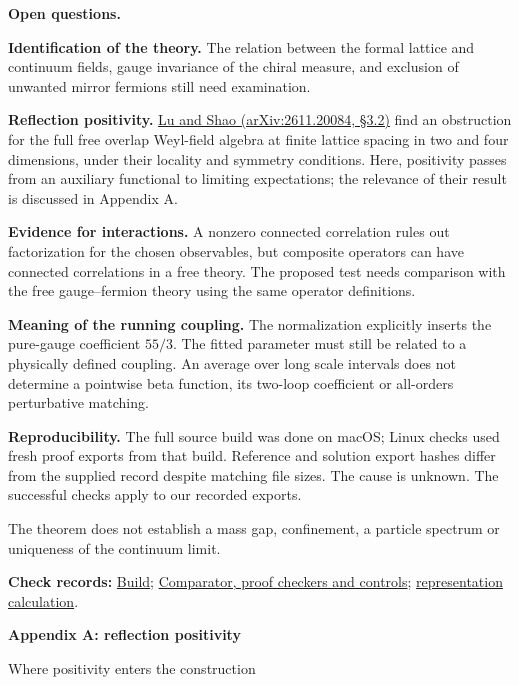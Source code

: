 \documentclass[11pt]{article}
\begin{document}
\textbf{Open questions.}
\begin{list}{\textbullet}{\setlength{\leftmargin}{12pt}\setlength{\itemsep}{2pt}\setlength{\parsep}{0pt}\setlength{\topsep}{2pt}}
\item \textbf{Identification of the theory.}
The relation between the formal lattice and continuum fields, gauge invariance
of the chiral measure, and exclusion of unwanted mirror fermions still need
examination.
\item \textbf{Reflection positivity.}
\href{https://arxiv.org/html/2611.20084v1#S3.SS2}{Lu and Shao (arXiv:2611.20084, \S3.2)}
find an obstruction for the full free overlap Weyl-field algebra at finite
lattice spacing in two and four dimensions, under their locality and symmetry
conditions. Here, positivity passes from an auxiliary functional to limiting
expectations; the relevance of their result is discussed in Appendix A.
\item \textbf{Evidence for interactions.}
A nonzero connected correlation rules out factorization for the chosen
observables, but composite operators can have connected correlations in a
free theory. The proposed test needs comparison with the free gauge--fermion
theory using the same operator definitions.
\item \textbf{Meaning of the running coupling.}
The normalization explicitly inserts the pure-gauge coefficient $55/3$.
The fitted parameter must still be related to a physically defined coupling.
An average over long scale intervals does not determine a pointwise beta
function, its two-loop coefficient or all-orders perturbative matching.
\item \textbf{Reproducibility.}
The full source build was done on macOS; Linux checks used fresh proof exports
from that build. Reference and solution export hashes differ from the supplied
record despite matching file sizes. The cause is unknown. The successful checks
apply to our recorded exports.
\end{list}

The theorem does not establish a mass gap, confinement, a particle spectrum
or uniqueness of the continuum limit.

{\small\textbf{Check records:}
\href{su5-native-build/status.html}{Build};
\href{su5-comparator/status.html}{Comparator, proof checkers and controls};
\href{su5-review-checks.json}{representation calculation}.}

\newpage
\begin{center}
{\Large\bfseries Appendix A: reflection positivity}\par
\vspace{3pt}
Where positivity enters the construction
\end{center}
\vspace{-4pt}
\end{document}
